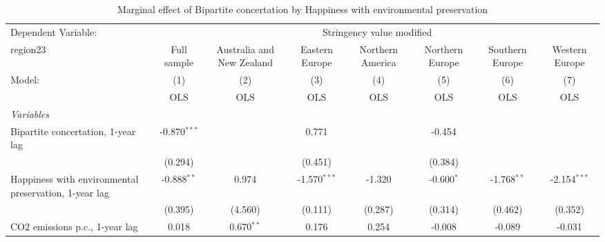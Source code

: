 
\begin{table}[htbp]
   \caption{Marginal effect of Bipartite concertation by Happiness with environmental preservation}
   \centering
   \begin{tabular}{lccccccc}
      \toprule
      Dependent Variable: & \multicolumn{7}{c}{Stringency value modified}\\
      region23                                                                                   & Full sample    & Australia and New Zealand & Eastern Europe & Northern America & Northern Europe & Southern Europe & Western Europe \\   
      Model:                                                                                     & (1)            & (2)                       & (3)            & (4)              & (5)             & (6)             & (7)\\  
                                                                                                 &  OLS           & OLS                       & OLS            & OLS              & OLS             & OLS             & OLS\\  
      \midrule
      \emph{Variables}\\
      Bipartite concertation, 1-year lag                                                         & -0.870$^{***}$ &                           & 0.771          &                  & -0.454          &                 &   \\   
                                                                                                 & (0.294)        &                           & (0.451)        &                  & (0.384)         &                 &   \\   
      Happiness with environmental preservation, 1-year lag                                      & -0.888$^{**}$  & 0.974                     & -1.570$^{***}$ & -1.320           & -0.600$^{*}$    & -1.768$^{**}$   & -2.154$^{***}$\\   
                                                                                                 & (0.395)        & (4.560)                   & (0.111)        & (0.287)          & (0.314)         & (0.462)         & (0.352)\\   
      CO2 emissions p.c., 1-year lag                                                             & 0.018          & 0.670$^{**}$              & 0.176          & 0.254            & -0.008          & -0.089          & -0.031\\   

\end{tabular}
\end{table}
